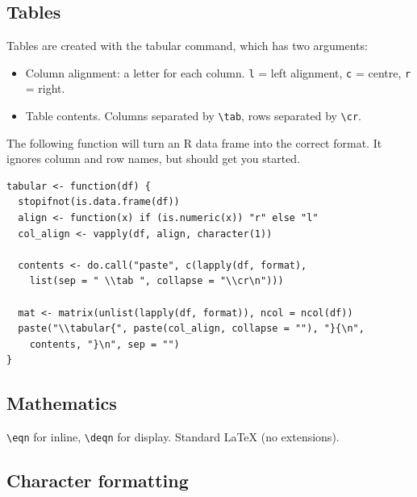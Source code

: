\subsection{Tables}

Tables are created with the tabular command, which has two arguments:

\begin{itemize}
\item
  Column alignment: a letter for each column. \texttt{l} = left
  alignment, \texttt{c} = centre, \texttt{r} = right.
\item
  Table contents. Columns separated by \texttt{\textbackslash{}tab},
  rows separated by \texttt{\textbackslash{}cr}.
\end{itemize}

The following function will turn an R data frame into the correct
format. It ignores column and row names, but should get you started.

\begin{verbatim}
tabular <- function(df) {
  stopifnot(is.data.frame(df))
  align <- function(x) if (is.numeric(x)) "r" else "l"
  col_align <- vapply(df, align, character(1))
  
  contents <- do.call("paste", c(lapply(df, format), 
    list(sep = " \\tab ", collapse = "\\cr\n")))
  
  mat <- matrix(unlist(lapply(df, format)), ncol = ncol(df))
  paste("\\tabular{", paste(col_align, collapse = ""), "}{\n",
    contents, "}\n", sep = "")
}
\end{verbatim}

\subsection{Mathematics}

\texttt{\textbackslash{}eqn} for inline, \texttt{\textbackslash{}deqn}
for display. Standard LaTeX (no extensions).

\subsection{Character formatting}


